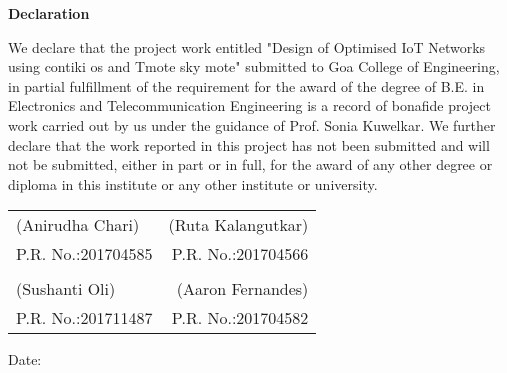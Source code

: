 \begin{center}
\begin{huge}
\bfseries{Declaration}\\
\end{huge}
\end{center}
\vspace{1cm}
We declare that the project work entitled "Design of Optimised IoT Networks using contiki os and Tmote sky mote" submitted to Goa College of Engineering, in partial fulfillment of the requirement for the award of the degree of B.E. in Electronics and Telecommunication Engineering is a record of bonafide project work carried out by us under the guidance of Prof. Sonia Kuwelkar. We further declare that the work reported in this project has not been submitted and will not be submitted, either in part or in full, for the award of any other degree or diploma in this institute or any other institute or university.\\







\vspace{1.3cm}
\vspace{1.3cm}
\begin{table}[H]
\begin{tabular}{lr}
(Anirudha Chari) & \hspace{6cm} (Ruta Kalangutkar) \\
P.R. No.:201704585 & \hspace{6cm} P.R. No.:201704566\\
\vspace{1.3cm}\\
(Sushanti Oli) & \hspace{6cm} (Aaron Fernandes)\\
P.R. No.:201711487 & \hspace{6cm} P.R. No.:201704582\\
\end{tabular}
\end{table}







\noindent Date:
